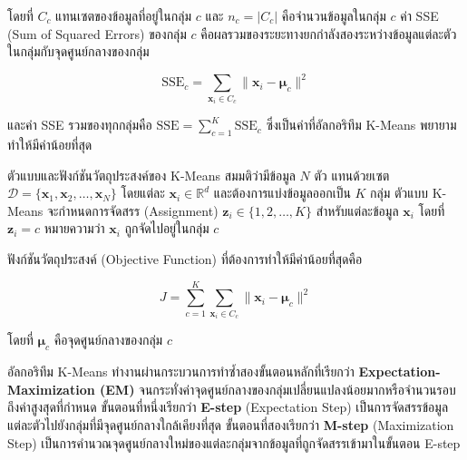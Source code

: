 โดยที่ $C_c$ แทนเซตของข้อมูลที่อยู่ในกลุ่ม $c$ และ $n_c = |C_c|$ คือจำนวนข้อมูลในกลุ่ม $c$ ค่า SSE (Sum of Squared Errors) ของกลุ่ม $c$ คือผลรวมของระยะทางยกกำลังสองระหว่างข้อมูลแต่ละตัวในกลุ่มกับจุดศูนย์กลางของกลุ่ม

\begin{equation}
\text{SSE}_c = \sum_{\mathbf{x}_i \in C_c} \|\mathbf{x}_i - \boldsymbol{\mu}_c\|^2
\end{equation}

และค่า SSE รวมของทุกกลุ่มคือ $\text{SSE} = \sum_{c=1}^{K} \text{SSE}_c$ ซึ่งเป็นค่าที่อัลกอริทึม K-Means พยายามทำให้มีค่าน้อยที่สุด

\begin{myBox}[]{ตัวแบบและฟังก์ชันวัตถุประสงค์ของ K-Means}{}
สมมติว่ามีข้อมูล $N$ ตัว แทนด้วยเซต $\mathcal{D} = \{\mathbf{x}_1, \mathbf{x}_2, \ldots, \mathbf{x}_N\}$ โดยแต่ละ $\mathbf{x}_i \in \mathbb{R}^d$ และต้องการแบ่งข้อมูลออกเป็น $K$ กลุ่ม ตัวแบบ K-Means จะกำหนดการจัดสรร (Assignment) $\mathbf{z}_i \in \{1, 2, \ldots, K\}$ สำหรับแต่ละข้อมูล $\mathbf{x}_i$ โดยที่ $\mathbf{z}_i = c$ หมายความว่า $\mathbf{x}_i$ ถูกจัดไปอยู่ในกลุ่ม $c$

ฟังก์ชันวัตถุประสงค์ (Objective Function) ที่ต้องการทำให้มีค่าน้อยที่สุดคือ

$$J = \sum_{c=1}^{K} \sum_{\mathbf{x}_i \in C_c} \|\mathbf{x}_i - \boldsymbol{\mu}_c\|^2$$

\noindent โดยที่ $\boldsymbol{\mu}_c$ คือจุดศูนย์กลางของกลุ่ม $c$
\end{myBox}

อัลกอริทึม K-Means ทำงานผ่านกระบวนการทำซ้ำสองขั้นตอนหลักที่เรียกว่า \textbf{Expectation-Maximization (EM)} จนกระทั่งค่าจุดศูนย์กลางของกลุ่มเปลี่ยนแปลงน้อยมากหรือจำนวนรอบถึงค่าสูงสุดที่กำหนด ขั้นตอนที่หนึ่งเรียกว่า \textbf{E-step} (Expectation Step) เป็นการจัดสรรข้อมูลแต่ละตัวไปยังกลุ่มที่มีจุดศูนย์กลางใกล้เคียงที่สุด ขั้นตอนที่สองเรียกว่า \textbf{M-step} (Maximization Step) เป็นการคำนวณจุดศูนย์กลางใหม่ของแต่ละกลุ่มจากข้อมูลที่ถูกจัดสรรเข้ามาในขั้นตอน E-step

